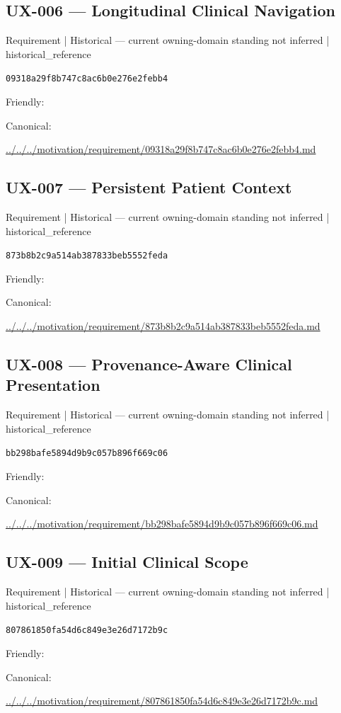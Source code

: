 \documentclass[10pt,a4paper]{article}
\begin{document}
\subsection*{UX-006 — Longitudinal Clinical Navigation}
{\small Requirement | Historical — current owning-domain standing not inferred | historical\_reference}\par
\texttt{09318a29f8b747c8ac6b0e276e2febb4}\par
Friendly: \par
Canonical: \par
{\footnotesize\url{../../../motivation/requirement/09318a29f8b747c8ac6b0e276e2febb4.md}}\par
\subsection*{UX-007 — Persistent Patient Context}
{\small Requirement | Historical — current owning-domain standing not inferred | historical\_reference}\par
\texttt{873b8b2c9a514ab387833beb5552feda}\par
Friendly: \par
Canonical: \par
{\footnotesize\url{../../../motivation/requirement/873b8b2c9a514ab387833beb5552feda.md}}\par
\subsection*{UX-008 — Provenance-Aware Clinical Presentation}
{\small Requirement | Historical — current owning-domain standing not inferred | historical\_reference}\par
\texttt{bb298bafe5894d9b9c057b896f669c06}\par
Friendly: \par
Canonical: \par
{\footnotesize\url{../../../motivation/requirement/bb298bafe5894d9b9c057b896f669c06.md}}\par
\subsection*{UX-009 — Initial Clinical Scope}
{\small Requirement | Historical — current owning-domain standing not inferred | historical\_reference}\par
\texttt{807861850fa54d6c849e3e26d7172b9c}\par
Friendly: \par
Canonical: \par
{\footnotesize\url{../../../motivation/requirement/807861850fa54d6c849e3e26d7172b9c.md}}\par
\end{document}
